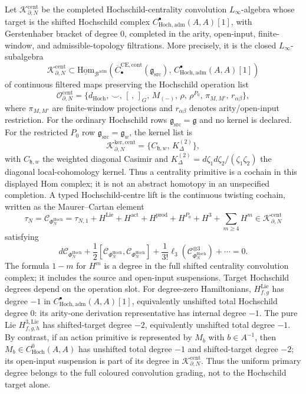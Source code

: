 \begin{defn}
Let \(\mathcal K^{\mathrm{cent}}_{\partial,N}\) be the completed
Hochschild-centrality convolution \(L_\infty\)-algebra whose target is
the shifted Hochschild complex
\(C^\bullet_{\mathrm{Hoch},\mathrm{adm}}(A,A)[1]\), with
Gerstenhaber bracket of degree \(0\), completed in the arity,
open-input, finite-window, and admissible-topology filtrations.  More
precisely, it is the closed \(L_\infty\)-subalgebra
\[
  \mathcal K^{\mathrm{cent}}_{\partial,N}
  \subset
  \underline{\mathrm{Hom}}_{\mathcal B^{\mathrm{adm}}}
  \left(
    \overline C^{\mathrm{CE},\mathrm{cont}}_\bullet
      (\mathfrak g_{\mathrm{src}}),\,
    C^\bullet_{\mathrm{Hoch},\mathrm{adm}}(A,A)[1]
  \right)
\]
of continuous filtered maps preserving the Hochschild operation list
\[
  \mathcal O^{\mathrm{cent}}_{\partial,N}
  =
  \{d_{\mathrm{Hoch}},\,\smile,\,[\, ,\,]_G,\,
    M_{(-)},\,\rho,\,\rho^{P_0},\,\pi_{M,M'},\,r_{\alpha\beta}\},
\]
where \(\pi_{M,M'}\) are finite-window projections and
\(r_{\alpha\beta}\) denotes arity/open-input restriction.  For the
ordinary Hochschild rows
\(\mathfrak g_{\mathrm{src}}=\mathfrak g\) and no kernel is declared.
For the restricted \(P_0\) row
\(\mathfrak g_{\mathrm{src}}=\mathfrak g_w\), the kernel list is
\[
  \mathcal K^{\mathrm{ker,cent}}_{\partial,N}
  =
  \{C_{\mathfrak h,w},\,K^{(2)}_\Delta\},
\]
with \(C_{\mathfrak h,w}\) the weighted diagonal Casimir and
\(K^{(2)}_\Delta=d\zeta_1d\zeta_2/(\zeta_1\zeta_2)\) the diagonal
local-cohomology kernel.  Thus a centrality primitive is a cochain in
this displayed Hom complex; it is not an abstract homotopy in an
unspecified completion.  A
typed Hochschild-centre lift is the continuous twisting cochain, written
as the Maurer--Cartan element
\[
  \tau_N=\mathcal C_{\Phi_N^{\mathrm{Hoch}}}
  =
  \tau_{N,1}
  +H^{\mathrm{Lie}}+H^{\mathrm{act}}
  +H^{\mathrm{prod}}+H^{P_0}+H^3+\sum_{m\ge4}H^m
  \in \mathcal K^{\mathrm{cent}}_{\partial,N}
\]
satisfying
\[
  d\mathcal C_{\Phi_N^{\mathrm{Hoch}}}
  +\frac12[\mathcal C_{\Phi_N^{\mathrm{Hoch}}},
           \mathcal C_{\Phi_N^{\mathrm{Hoch}}}]
  +\frac{1}{3!}\ell_3
    (\mathcal C_{\Phi_N^{\mathrm{Hoch}}}^{\otimes3})
  +\cdots=0.
\]
The formula \(1-m\) for \(H^m\) is a degree in the full shifted
centrality convolution complex; it includes the source and open-input
suspensions.  Target Hochschild degrees depend on the operation slot.
For degree-zero Hamiltonians,
\(H^{\mathrm{Lie}}_{f,g}\) has degree \(-1\) in
\(C^\bullet_{\mathrm{Hoch},\mathrm{adm}}(A,A)[1]\), equivalently
unshifted total Hochschild degree \(0\): its arity-one derivation
representative has internal degree \(-1\).  The pure Lie
\(H^{3,\mathrm{Lie}}_{f,g,h}\) has shifted-target degree \(-2\),
equivalently unshifted total degree \(-1\).  By contrast, if an action
primitive is represented by \(M_b\) with \(b\in A^{-1}\), then
\(M_b\in C^0_{\mathrm{Hoch}}(A,A)\) has unshifted total degree \(-1\)
and shifted-target degree \(-2\); its open-input suspension is part of
its degree in \(\mathcal K^{\mathrm{cent}}_{\partial,N}\).  Thus the
uniform primary degree belongs to the full coloured convolution
grading, not to the Hochschild target alone.


\end{defn}
